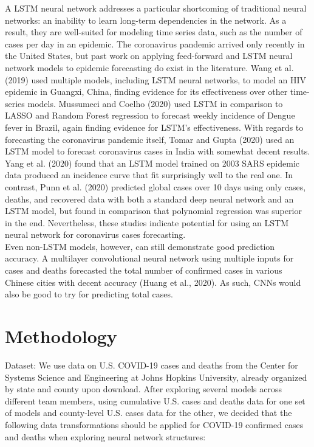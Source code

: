 ﻿\documentclass{article}
\begin{document}
\begin{multicols}{2}
A LSTM neural network addresses a particular shortcoming of traditional neural
networks: an inability to learn long-term dependencies in the network. As a
result, they are well-suited for modeling time series data, such as the number
of cases per day in an epidemic. The coronavirus pandemic arrived only recently
in the United States, but past work on applying feed-forward and LSTM neural
network models to epidemic forecasting do exist in the literature. Wang et al.
(2019) used multiple models, including LSTM neural networks, to model an HIV
epidemic in Guangxi, China, finding evidence for its effectiveness over other
time-series models. Mussumeci and Coelho (2020) used LSTM in comparison to LASSO
and Random Forest regression to forecast weekly incidence of Dengue fever in
Brazil, again finding evidence for LSTM’s effectiveness. With regards to
forecasting the coronavirus pandemic itself, Tomar and Gupta (2020) used an LSTM
model to forecast coronavirus cases in India with somewhat decent results. Yang
et al. (2020) found that an LSTM model trained on 2003 SARS epidemic data
produced an incidence curve that fit surprisingly well to the real one. In
contrast, Punn et al. (2020) predicted global cases over 10 days using only
cases, deaths, and recovered data with both a standard deep neural network and
an LSTM model, but found in comparison that polynomial regression was superior
in the end. Nevertheless, these studies indicate potential for using an LSTM
neural network for coronavirus cases forecasting.\\
Even non-LSTM models, however, can still demonstrate good prediction accuracy. A
multilayer convolutional neural network using multiple inputs for cases and
deaths forecasted the total number of confirmed cases in various Chinese cities
with decent accuracy (Huang et al., 2020). As such, CNNs would also be good to
try for predicting total cases.

\section*{Methodology}

Dataset: We use data on U.S. COVID-19 cases and deaths from the Center for
Systems Science and Engineering at Johns Hopkins University, already organized
by state and county upon download. After exploring several models across
different team members, using cumulative U.S. cases and deaths data for one
set of models and county-level U.S. cases data for the other, we decided that
the following data transformations should be applied for COVID-19 confirmed
cases and deaths when exploring neural network structures:


\end{multicols}
\end{document}
